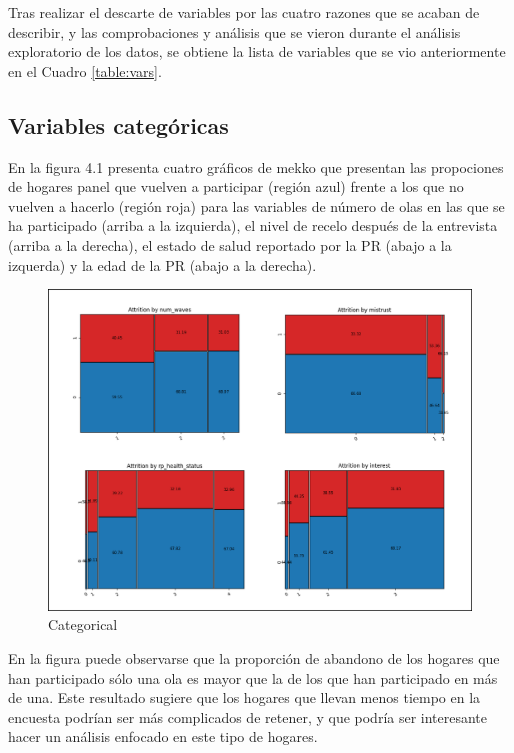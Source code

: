 Tras realizar el descarte de variables por las cuatro razones que se acaban de describir, y las comprobaciones y análisis que se vieron durante el análisis exploratorio de los datos, se obtiene la lista de variables que se vio anteriormente en el Cuadro  \ref{table:vars}.

\subsection*{Variables categóricas}

En la figura 4.1 presenta cuatro gráficos de mekko que presentan las propociones de hogares panel que vuelven a participar (región azul) frente a los que no vuelven a hacerlo (región roja) para las variables de número de olas en las que se ha participado (arriba a la izquierda), el nivel de recelo después de la entrevista (arriba a la derecha), el estado de salud reportado por la PR (abajo a la izquerda) y la edad de la PR (abajo a la derecha).

\begin{figure}
	\centering
	\includegraphics[width=1\textwidth]{figs/categorical.png}
	\caption{Categorical}
	\label{fig:categorical}
\end{figure}

En la figura puede observarse que la proporción de abandono de los hogares que han participado sólo una ola es mayor que la de los que han participado en más de una. Este resultado sugiere que los hogares que llevan menos tiempo en la encuesta podrían ser más complicados de retener, y que podría ser interesante hacer un análisis enfocado en este tipo de hogares.

